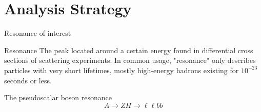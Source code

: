 \documentclass[10pt]{beamer} %
\begin{document}
\section{Analysis Strategy}

\begin{frame}{Resonance of interest}

    \begin{block}{Resonance}
     The peak located around a certain energy found in differential cross sections of scattering experiments. In common usage, "resonance" only describes particles with very short lifetimes, mostly high-energy hadrons existing for $10^{-23}$ seconds or less.
    \end{block}

\begin{block}{The pseudoscalar boson resonance}
\begin{equation*}
        A \to ZH \to \ell\ell b b
\end{equation*}

\end{block}


\end{frame}
\end{document}
